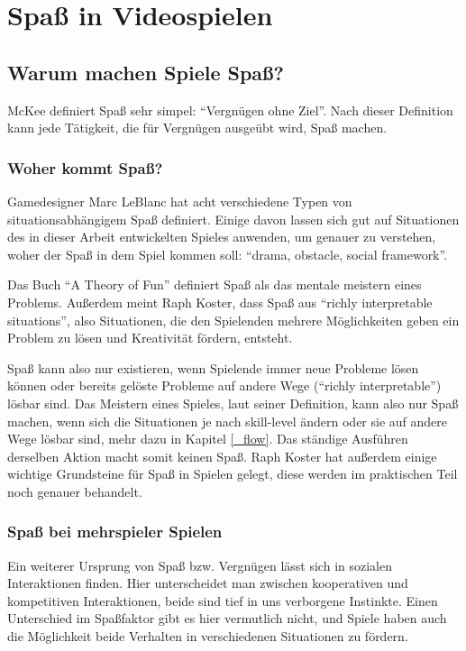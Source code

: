 \chapter{Spaß in Videospielen}

\section{Warum machen Spiele Spaß?}

McKee definiert Spaß sehr simpel: "`Vergnügen ohne Ziel"'. Nach dieser Definition kann jede Tätigkeit, die für Vergnügen ausgeübt wird, Spaß machen\cite{_fun}.

\subsection{Woher kommt Spaß?}

Gamedesigner Marc LeBlanc hat acht verschiedene Typen von situationsabhängigem Spaß definiert. Einige davon lassen sich gut auf Situationen des in dieser Arbeit entwickelten Spieles anwenden, um genauer zu verstehen, woher der Spaß in dem Spiel kommen soll: "`drama, obstacle, social framework"'. 

Das Buch "`A Theory of Fun"'\cite{_theory_of_fun} definiert Spaß als das mentale meistern eines Problems\cite[S. 71]{_theory_of_fun}. Außerdem meint Raph Koster, dass Spaß aus "`richly interpretable situations"'\cite[S. 40]{_theory_of_fun}, also Situationen, die den Spielenden mehrere Möglichkeiten geben ein Problem zu lösen und Kreativität fördern, entsteht. 

Spaß kann also nur existieren, wenn Spielende immer neue Probleme lösen können oder bereits gelöste Probleme auf andere Wege ("`richly interpretable"') lösbar sind. Das Meistern eines Spieles, laut seiner Definition, kann also nur Spaß machen, wenn sich die Situationen je nach skill-level ändern oder sie auf andere Wege lösbar sind, mehr dazu in Kapitel \ref{_flow}. Das ständige Ausführen derselben Aktion macht somit keinen Spaß. Raph Koster hat außerdem einige wichtige Grundsteine für Spaß in Spielen gelegt, diese werden im praktischen Teil noch genauer behandelt.

\subsection{Spaß bei mehrspieler Spielen}

Ein weiterer Ursprung von Spaß bzw. Vergnügen lässt sich in sozialen Interaktionen finden\cite[S. 72]{_theory_of_fun}. Hier unterscheidet man zwischen kooperativen und kompetitiven Interaktionen, beide sind tief in uns verborgene Instinkte\cite[S. 310]{_art_of_gamedesign}. Einen Unterschied im Spaßfaktor gibt es hier vermutlich nicht\cite{_competition_vs_cooperation}, und Spiele haben auch die Möglichkeit beide Verhalten in verschiedenen Situationen zu fördern.

